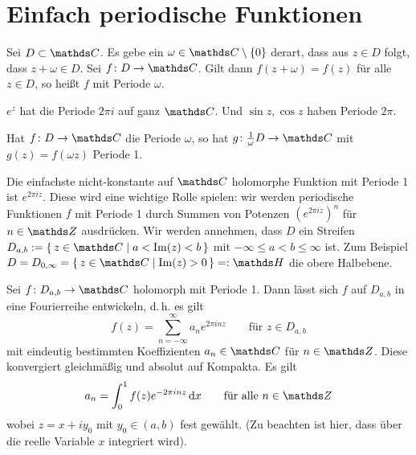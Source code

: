 \section{Einfach periodische Funktionen}

\begin{defi}
Sei $D \subset \CC$. Es gebe ein $\omega \in \CC\setminus\{0\}$ derart, dass aus $z\in D$ folgt, dass $z+\omega \in D$. Sei $f\colon D\ra \CC$. Gilt dann $f(z+\omega) = f(z)$ für alle $z \in D$, so heißt $f$  mit Periode $\omega$.
\end{defi}

\begin{bsp}
$e^z$ hat die Periode $2\pi i$ auf ganz $\CC$. Und $\sin z, \cos z$ haben Periode $2\pi$.
\end{bsp}

Hat $f\colon D \ra \CC$ die Periode $\omega$, so hat $g\colon \frac{1}{\omega}D \ra \CC$ mit $g(z) = f(\omega z)$ Periode 1.

Die einfachste nicht-konstante auf $\CC$ holomorphe Funktion mit Periode 1 ist $e^{2\pi i z}$.
Diese wird eine wichtige Rolle spielen: wir werden periodische Funktionen $f$ mit Periode 1 durch Summen von Potenzen $(e^{2\pi iz})^n$ für $n\in\ZZ$ ausdrücken.
Wir werden annehmen, dass $D$ ein Streifen $D_{a,b} := \Set{z\in \CC \mid a < \Im(z) < b}$ mit $-\infty \leq a < b \leq \infty$ ist.
Zum Beispiel $D = D_{0,\infty} = \Set{z\in\CC \mid \Im(z) > 0} =: \HH$ die obere Halbebene.

\begin{satz}\label{satz:fourierentwicklung}
Sei $f\colon D_{a,b} \ra \CC$ holomorph mit Periode 1.
Dann lässt sich $f$ auf $D_{a,b}$ in eine Fourierreihe entwickeln, d.\,h. es gilt
\[
	f(z)
	= \sum_{n=-\infty}^\infty a_ne^{2\pi inz}
	\qquad \text{für } z\in D_{a,b}
\]
mit eindeutig bestimmten Koeffizienten $a_n\in\CC$ für $n\in\ZZ$.
Diese konvergiert gleichmäßig und absolut auf Kompakta.
Es gilt
\[
	a_n = \int_0^1 f(z)e^{-2\pi inz} \opd x
	\qquad \text{für alle } n\in\ZZ
\]
wobei $z=x+iy_0$ mit $y_0\in (a,b)$ fest gewählt.
(Zu beachten ist hier, dass über die reelle Variable $x$ integriert wird).
\end{satz}

